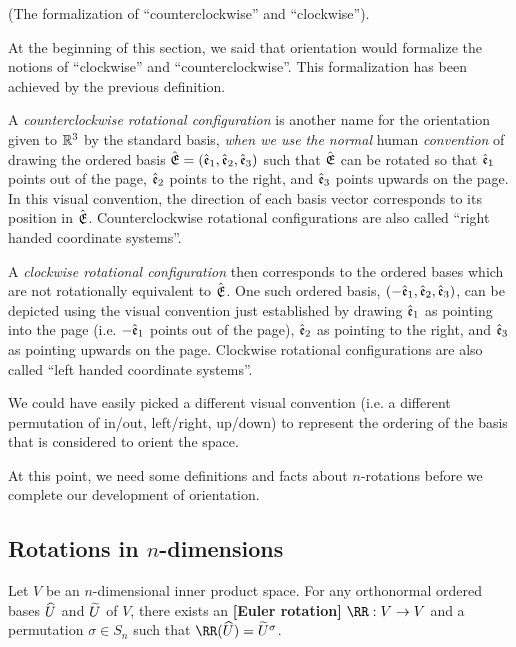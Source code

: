 \begin{remark}
\label{ch::exterior_pwrs::rmk::formalization_ccw_cw}
    (The formalization of ``counterclockwise'' and ``clockwise'').
    
    At the beginning of this section, we said that orientation would formalize the notions of ``clockwise'' and ``counterclockwise''. This formalization has been achieved by the previous definition.
    
    A \textit{counterclockwise rotational configuration} is another name for the orientation given to $\mathbb{R}^3$ by the standard basis, \textit{when we use the normal} human \textit{convention} of drawing the ordered basis ${\hat{\mathfrak{E}}} = (\hat{\mathfrak{e}}_1, \hat{\mathfrak{e}}_2, \hat{\mathfrak{e}}_3)$ such that ${\hat{\mathfrak{E}}}$ can be rotated so that $\hat{\mathfrak{e}}_1$ points out of the page, $\hat{\mathfrak{e}}_2$ points to the right, and $\hat{\mathfrak{e}}_3$ points upwards on the page. In this visual convention, the direction of each basis vector corresponds to its position in ${\hat{\mathfrak{E}}}$. Counterclockwise rotational configurations are also called ``right handed coordinate systems''.
    
    A \textit{clockwise rotational configuration} then corresponds to the ordered bases which are not rotationally equivalent to ${\hat{\mathfrak{E}}}$. One such ordered basis, $(-\hat{\mathfrak{e}}_1, \hat{\mathfrak{e}}_2, \hat{\mathfrak{e}}_3)$, can be depicted using the visual convention just established by drawing $\hat{\mathfrak{e}}_1$ as pointing into the page (i.e. $-\hat{\mathfrak{e}}_1$ points out of the page), $\hat{\mathfrak{e}}_2$ as pointing to the right, and $\hat{\mathfrak{e}}_3$ as pointing upwards on the page. Clockwise rotational configurations are also called ``left handed coordinate systems''.
    
    We could have easily picked a different visual convention (i.e. a different permutation of in/out, left/right, up/down) to represent the ordering of the basis that is considered to orient the space.
\end{remark}

At this point, we need some definitions and facts about $n$-rotations before we complete our development of orientation.

\subsection*{Rotations in $n$-dimensions}


\begin{theorem}
    Let $V$ be an $n$-dimensional inner product space. For any orthonormal ordered bases $\widehat{U}$ and $\widetilde{U}$ of $V$, there exists an \textbf{[Euler rotation]} $\RR:V \rightarrow V$ and a permutation $\sigma \in S_n$ such that $\RR(\hU) = \tU^\sigma$.
\end{theorem}

